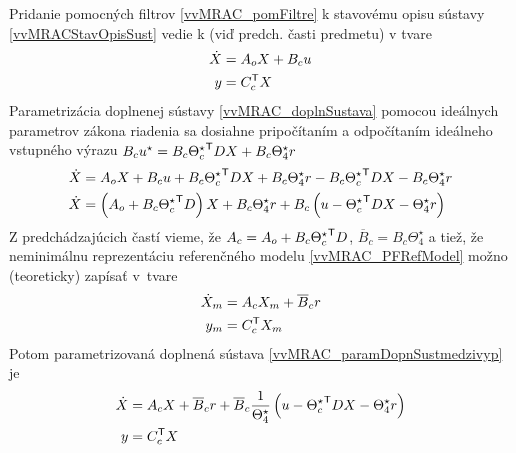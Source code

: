 ﻿\documentclass[a4paper, 10pt, ]{article}
\begin{document}
Pridanie pomocných filtrov \eqref{vvMRAC_pomFiltre} k stavovému opisu sústavy \eqref{vvMRACStavOpisSust} vedie k  (viď predch. časti predmetu) v tvare
\begin{subequations} \label{vvMRAC_doplnSustava}
	\begin{align}
		\dot X &=  A_o  X + B_c u \\
		y &= C_c^{\mathsf{T}}  X
	\end{align}
\end{subequations}
Parametrizácia doplnenej sústavy \eqref{vvMRAC_doplnSustava} pomocou ideálnych parametrov zákona riadenia sa dosiahne pripočítaním a odpočítaním ideálneho vstupného výrazu $B_c u^\star = B_c {\Theta_c^\star}^{\mathsf{T}} D  X + B_c \Theta_4^\star r $
\begin{subequations} \label{vvMRAC_doplnSustava_02}
	\begin{align}
		\dot X &= A_o X + B_c u +  B_c {\Theta_c^\star}^{\mathsf{T}} D   X  + B_c  \Theta_4^\star  r - B_c {\Theta_c^\star}^{\mathsf{T}} D   X  -  B_c  \Theta_4^\star  r	\\
		\dot X &= \left( A_o + B_c {\Theta_c^\star}^{\mathsf{T}} D \right)  X + B_c  \Theta_4^\star r + B_c \left( u - {\Theta_c^\star}^{\mathsf{T}} D  X - \Theta_4^\star  r \right)	  \label{vvMRAC_paramDopnSustmedzivyp}
	\end{align}
\end{subequations}
Z predchádzajúcich častí vieme, že $ A_c = A_o + B_c {\Theta_c^\star}^{\mathsf{T}} D $, $\overline{B}_c = B_c \Theta_4^\star$ a tiež, že neminimálnu reprezentáciu referenčného modelu \eqref{vvMRAC_PFRefModel} možno (teoreticky) zapísať v~tvare
\begin{subequations} \label{vvMRAC_NeminRefModel}
	\begin{align}
		\dot X_m &= A_c X_m + \overline{B}_c r \\
		y_m &= C_c^{\mathsf{T}} X_m
	\end{align}
\end{subequations}
Potom parametrizovaná doplnená sústava \eqref{vvMRAC_paramDopnSustmedzivyp} je
\begin{subequations}
\label{vvMRAC_ParametrizovanaDoplnSustava}
	\begin{align}
		\dot X &= A_c X + \overline{B}_c r + \overline{B}_c \frac{1}{\Theta_4^\star} \left( u - {\Theta_c^\star}^{\mathsf{T}} D  X - \Theta_4^\star r \right) \\
		y &= C_c^{\mathsf{T}}  X
	\end{align}
\end{subequations}
\end{document}
